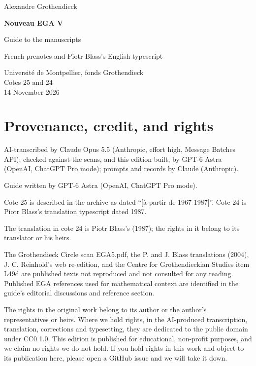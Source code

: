 \documentclass[10pt,a4paper]{article}
\begin{document}
\hypersetup{pageanchor=false}
\begin{titlepage}\thispagestyle{empty}\vspace*{20mm}
{\Large Alexandre Grothendieck\par}\vspace{12mm}
{\Huge\bfseries Nouveau EGA V\par}\vspace{8mm}
{\Large Guide to the manuscripts\par}\vspace{7mm}
{\large French prenotes and Piotr Blass's English typescript\par}\vspace{12mm}
Université de Montpellier, fonds Grothendieck\\ Cotes 25 and 24\\
14 November 2026
\vfill\end{titlepage}\clearpage\hypersetup{pageanchor=true}
\section*{Provenance, credit, and rights}
AI-transcribed by Claude Opus 5.5 (Anthropic, effort high, Message Batches API); checked against the scans, and this edition built, by GPT-6 Astra (OpenAI, ChatGPT Pro mode); prompts and records by Claude (Anthropic).

Guide written by GPT-6 Astra (OpenAI, ChatGPT Pro mode).

Cote 25 is described in the archive as dated “[à partir de 1967-1987]”. Cote 24 is Piotr Blass's translation typescript dated 1987.

The translation in cote 24 is Piotr Blass's (1987); the rights in it belong to its translator or his heirs.

The Grothendieck Circle scan EGA5.pdf, the P. and J. Blass translations (2004), J. C. Reinhold's web re-edition, and the Centre for Grothendieckian Studies item L49d are published texts not reproduced and not consulted for any reading. Published EGA references used for mathematical context are identified in the guide's editorial discussions and reference section.

The rights in the original work belong to its author or the author's representatives or heirs. Where we hold rights, in the AI-produced transcription, translation, corrections and typesetting, they are dedicated to the public domain under CC0 1.0. This edition is published for educational, non-profit purposes, and we claim no rights we do not hold. If you hold rights in this work and object to its publication here, please open a GitHub issue and we will take it down.
\end{document}
